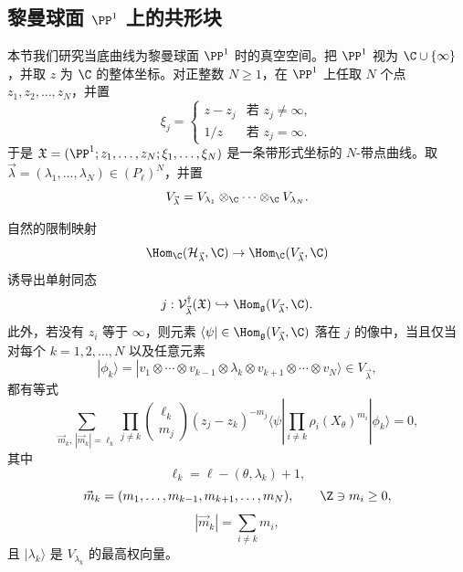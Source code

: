 \subsection{黎曼球面 $\PP^1$ 上的共形块}
本节我们研究当底曲线为黎曼球面 $\PP^1$ 时的真空空间。把 $\PP^1$ 视为 $\C\cup\{\infty\}$，并取 $z$ 为 $\C$ 的整体坐标。对正整数 $N\ge 1$，在 $\PP^1$ 上任取 $N$ 个点 $z_1,z_2,\dots,z_N$，并置
\[
\xi_j=\begin{cases}
z-z_j & \text{若 } z_j\ne\infty,\\
1/z & \text{若 } z_j=\infty.
\end{cases}
\]
于是 $\mathfrak{X}=(\PP^1;z_1,\dots,z_N;\xi_1,\dots,\xi_N)$ 是一条带形式坐标的 $N$-带点曲线。取 $\vec\lambda=(\lambda_1,\dots,\lambda_N)\in(P_\ell)^N$，并置
\[
V_{\vec\lambda}=V_{\lambda_1}\otimes_{\C}\cdots\otimes_{\C}V_{\lambda_N}.
\]
\begin{proposition}[6.1]
自然的限制映射
\[
\Hom_{\C}(\mathcal{H}_{\vec\lambda},\C)\to\Hom_{\C}(V_{\vec\lambda},\C)
\]
诱导出单射同态
\[
j:\mathcal{V}^{\dagger}_{\vec\lambda}(\mathfrak{X})\hookrightarrow\Hom_{\mathfrak{g}}(V_{\vec\lambda},\C).
\]
此外，若没有 $z_i$ 等于 $\infty$，则元素 $\langle\psi|\in\Hom_{\mathfrak{g}}(V_{\vec\lambda},\C)$ 落在 $j$ 的像中，当且仅当对每个 $k=1,2,\dots,N$ 以及任意元素
\[
|\phi_k\rangle=|v_1\otimes\cdots\otimes v_{k-1}\otimes\lambda_k\otimes v_{k+1}\otimes\cdots\otimes v_N\rangle\in V_{\vec\lambda},
\]
都有等式
\begin{equation}
\sum_{\vec m_k,\,|\vec m_k|=\ell_k}\prod_{j\ne k}\binom{\ell_k}{m_j}(z_j-z_k)^{-m_j}\langle\psi|\prod_{i\ne k}\rho_i(X_\theta)^{m_i}|\phi_k\rangle=0,\tag{6.1}
\end{equation}
其中
\[
\ell_k=\ell-(\theta,\lambda_k)+1,
\]
\[
\vec m_k=(m_1,\dots,m_{k-1},m_{k+1},\dots,m_N),\qquad \Z\ni m_i\ge 0,
\]
\[
|\vec m_k|=\sum_{i\ne k}m_i,
\]
且 $|\lambda_k\rangle$ 是 $V_{\lambda_k}$ 的最高权向量。
\end{proposition}

